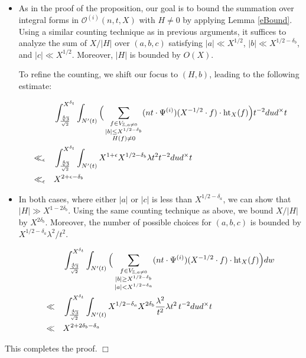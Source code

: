 \documentclass{article}
\def \h{{\rm ht}}
\newenvironment{proof}{\noindent {\bf Proof:}}{$\Box$ \vspace{2 ex}}
\def \Bo{{\mathcal{O}^{(i)}(n,t,X)}}
\def \dw{{t^{-2}dud^\times t  }}
\begin{document}
\begin{proof}
\begin{itemize}
  \item[\textnormal{(a)}] As in the proof of the proposition, our goal is to bound the summation over integral forms in $\Bo$ with $H \neq 0$ by applying Lemma \ref{eBound}. Using a similar counting technique as in previous arguments, it suffices to analyze the sum of $X/|H|$ over $(a, b, c)$ satisfying $|a| \ll X^{1/2}$, $|b| \ll X^{1/2-\delta_b}$, and $|c| \ll X^{1/2}$. Moreover, $|H|$ is bounded by $O(X)$.  

To refine the counting, we shift our focus to $(H, b)$, leading to the following estimate:

\begin{align*}
& \int_{\frac{\sqrt[4]{3}}{\sqrt{2}}}^{X^{\delta_t}} \int_{N'(t)}  
      \Big( \sum_{\substack{f \in V_{\mathbb{Z}, a\neq 0} \\ |b| \leq X^{1/2-\delta_b}\\ H(f) \neq 0}} (nt \cdot \Psi^{(i)})(X^{-1/2} \cdot f) \cdot \h_{X}(f) \Big)\dw \\ \ll_{\epsilon} \quad
    &\int_{\frac{\sqrt[4]{3}}{\sqrt{2}}}^{X^{\delta_t}} \int_{N'(t)}   X^{1+\epsilon}X^{1/2-\delta_b} \lambda t^2 \dw \\ \ll_{\epsilon} \quad
    &X^{2+\epsilon -\delta_b}
\end{align*}
\item[\textnormal{(b)}] In both cases, where either $|a|$ or $|c|$ is less than $X^{1/2-\delta_a}$, we can show that $|H| \gg X^{1-2\delta_b}$. Using the same counting technique as above, we bound $X/|H|$ by $X^{2\delta_b}$. Moreover, the number of possible choices for $(a, b, c)$ is bounded by $X^{1/2-\delta_a} \lambda^2 / t^2$.

\begin{align*}
&\int_{\frac{\sqrt[4]{3}}{\sqrt{2}}}^{X^{\delta_t}} \int_{N'(t)}  
       \Big( \sum_{\substack{f \in V_{\mathbb{Z}, a\neq 0} \\ |b| \geq X^{1/2-\delta_b}\\ |a| <X^{1/2-\delta_a}}} (nt \cdot \Psi^{(i)})(X^{-1/2} \cdot f) \cdot \h_{X}(f) \Big)
      dw \\ \ll \quad
    &\int_{\frac{\sqrt[4]{3}}{\sqrt{2}}}^{X^{\delta_t}} \int_{N'(t)}  X^{1/2-\delta_a} X^{2\delta_b}\frac{\lambda^{2}}{t^2}\lambda t^2 \,  \dw   
    \\ \ll \quad
    & X^{2+2\delta_b-\delta_a}
\end{align*}
\end{itemize}
This completes the proof.
\end{proof}
\end{document}
